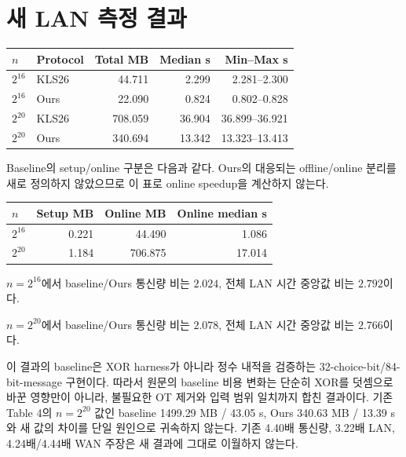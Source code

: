 \documentclass[11pt,a4paper]{article}
\begin{document}
\section{새 LAN 측정 결과}
\begin{center}\begin{tabular}{llrrr}\toprule $n$ & Protocol & Total MB & Median s & Min--Max s \\ \midrule
$2^{16}$ & KLS26 & 44.711 & 2.299 & 2.281--2.300 \\
$2^{16}$ & Ours & 22.090 & 0.824 & 0.802--0.828 \\
$2^{20}$ & KLS26 & 708.059 & 36.904 & 36.899--36.921 \\
$2^{20}$ & Ours & 340.694 & 13.342 & 13.323--13.413 \\
\bottomrule\end{tabular}\end{center}
Baseline의 setup/online 구분은 다음과 같다. Ours의 대응되는 offline/online 분리를 새로 정의하지 않았으므로 이 표로 online speedup을 계산하지 않는다.
\begin{center}\begin{tabular}{lrrr}\toprule $n$ & Setup MB & Online MB & Online median s \\ \midrule
$2^{16}$ & 0.221 & 44.490 & 1.086 \\
$2^{20}$ & 1.184 & 706.875 & 17.014 \\
\bottomrule\end{tabular}\end{center}

$n=2^{16}$에서 baseline/Ours 통신량 비는 $2.024$, 전체 LAN 시간 중앙값 비는 $2.792$이다.

$n=2^{20}$에서 baseline/Ours 통신량 비는 $2.078$, 전체 LAN 시간 중앙값 비는 $2.766$이다.

이 결과의 baseline은 XOR harness가 아니라 정수 내적을 검증하는 32-choice-bit/84-bit-message 구현이다.
따라서 원문의 baseline 비용 변화는 단순히 XOR를 덧셈으로 바꾼 영향만이 아니라,
불필요한 OT 제거와 입력 범위 일치까지 합친 결과이다.
기존 Table 4의 $n=2^{20}$ 값인 baseline 1499.29 MB / 43.05 s,
Ours 340.63 MB / 13.39 s와 새 값의 차이를 단일 원인으로 귀속하지 않는다.
기존 4.40배 통신량, 3.22배 LAN, 4.24배/4.44배 WAN 주장은 새 결과에 그대로 이월하지 않는다.
\end{document}
